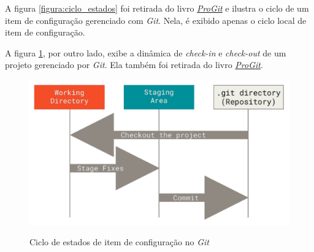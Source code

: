 A figura \ref{figura:ciclo_estados} foi retirada do livro \href{https://git-scm.com/book/en/v2}{\textit{ProGit}} e ilustra o ciclo de um item de configuração gerenciado com \textit{Git}.
Nela, é exibido apenas o ciclo local de item de configuração.
\par A figura \ref{figura:secoes_projeto_git}, por outro lado, exibe a dinâmica de \textit{check-in} e \textit{check-out} de um projeto gerenciado por \textit{Git}. Ela também foi retirada do livro \href{https://git-scm.com/book/en/v2}{\textit{ProGit}}.

\begin{figure}[H]
    \caption{Ciclo de estados de item de configuração no \textit{Git}}
    \vspace{0.5cm}
    \centering
    \includegraphics[width=15cm]{imagens/sections_git_project.png}
    \label{figura:secoes_projeto_git}
\end{figure}

